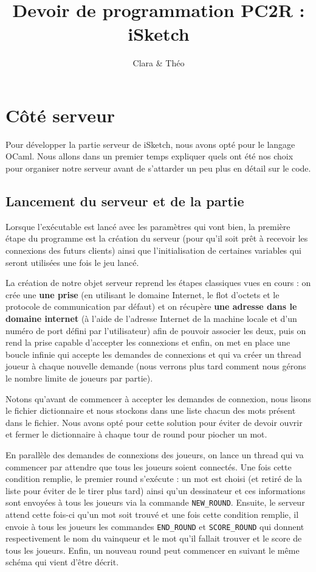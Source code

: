 \documentclass[a4paper, 11pt]{article}
\title{Devoir de programmation PC2R : iSketch}
\author{Clara \bsc{Muller} \& Théo \bsc{Lebourg}}
\date{}
\begin{document}
\maketitle

\section{Côté serveur}
Pour développer la partie serveur de iSketch, nous avons opté pour le
langage OCaml. Nous allons dans un premier temps expliquer quels ont
été nos choix pour organiser notre serveur avant de s’attarder un peu
plus en détail sur le code.

\subsection {Lancement du serveur et de la partie}
Lorsque l'exécutable est lancé avec les paramètres qui vont bien, la
première étape du programme est la création du serveur (pour qu’il
soit prêt à recevoir les connexions des futurs clients) ainsi que
l’initialisation de certaines variables qui seront utilisées une fois
le jeu lancé.

\bigskip La création de notre objet serveur reprend les étapes
classiques vues en cours : on crée une \textbf{une prise} (en
utilisant le domaine Internet, le flot d’octets et le protocole de
communication par défaut) et on récupère \textbf{une adresse dans le
  domaine internet} (à l’aide de l’adresse Internet de la machine
locale et d’un numéro de port défini par l’utilisateur) afin de
pouvoir associer les deux, puis on rend la prise capable d’accepter
les connexions et enfin, on met en place une boucle infinie qui
accepte les demandes de connexions et qui va créer un thread joueur à
chaque nouvelle demande (nous verrons plus tard comment nous gérons le
nombre limite de joueurs par partie).

Notons qu’avant de commencer à accepter les demandes de connexion,
nous lisons le fichier dictionnaire et nous stockons dans une liste
chacun des mots présent dans le fichier. Nous avons opté pour cette
solution pour éviter de devoir ouvrir et fermer le dictionnaire à
chaque tour de round pour piocher un mot. 

\bigskip En parallèle des demandes de connexions des joueurs, on lance
un thread qui va commencer par attendre que tous les joueurs soient
connectés. Une fois cette condition remplie, le premier round
s’exécute : un mot est choisi (et retiré de la liste pour éviter de le
tirer plus tard) ainsi qu’un dessinateur et ces informations sont
envoyées à tous les joueurs via la commande \verb+NEW_ROUND+. Ensuite,
le serveur attend cette fois-ci qu’un mot soit trouvé et une fois
cette condition remplie, il envoie à tous les joueurs les commandes
\verb+END_ROUND+ et \verb+SCORE_ROUND+ qui donnent respectivement le
nom du vainqueur et le mot qu’il fallait trouver et le score de tous
les joueurs. Enfin, un nouveau round peut commencer en suivant le même
schéma qui vient d’être décrit.
\end{document}

